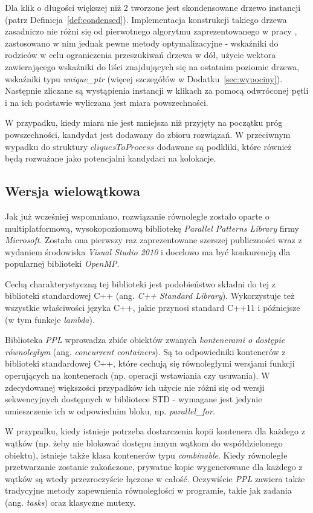 \documentclass[12pt]{article}
\newcounter{algorytm}
\begin{document}
Dla klik o długości większej niż 2 tworzone jest skondensowane drzewo instancji (patrz Definicja~\ref{def:condensed}). Implementacja konstrukcji takiego drzewa zasadniczo nie różni się od pierwotnego algorytmu zaprezentowanego w pracy \cite{chinczyki}, zastosowano w nim jednak pewne metody optymalizacyjne - wskaźniki do rodziców w celu ograniczenia przeszukiwań drzewa w dół, użycie wektora zawierającego wskaźniki do liści znajdujących się na ostatnim poziomie drzewa, wskaźniki typu \textit{unique\_ptr} (więcej szczegółów w Dodatku~\ref{sec:wypociny}). Następnie zliczane są wystąpienia instancji w klikach za pomocą odwróconej pętli i na ich podstawie wyliczana jest miara powszechności.

W przypadku, kiedy miara nie jest mniejsza niż przyjęty na początku próg powszechności, kandydat jest dodawany do zbioru rozwiązań. W przeciwnym wypadku do struktury $ cliquesToProcess $ dodawane są podkliki, które również będą rozważane jako potencjalni kandydaci na kolokacje.

\subsection{Wersja wielowątkowa}

Jak już wcześniej wspomniano, rozwiązanie równoległe zostało oparte o multiplatformową, wysokopoziomową bibliotekę \textit{Parallel Patterns Library} firmy \textit{Microsoft}. Została ona pierwszy raz zaprezentowane szerszej publiczności wraz z wydaniem środowiska \textit{Visual Studio 2010} i docelowo ma być konkurencją dla popularnej biblioteki \textit{OpenMP}. 

Cechą charakterystyczną tej biblioteki jest podobieństwo składni do tej z biblioteki standardowej C++ (ang. \textit{C++ Standard Library}). Wykorzystuje też wszystkie właściwości języka C++, jakie przynosi standard C++11 i późniejsze (w tym funkcje \textit{lambda}).

Biblioteka \textit{PPL} wprowadza zbiór obiektów zwanych \textit{kontenerami o dostępie równoległym} (ang. \textit{concurrent containers}). Są to odpowiedniki kontenerów z biblioteki standardowej C++, które cechują się równoległymi wersjami funkcji operujących na kontenerach (np. operacji wstawiania czy usuwania). W zdecydowanej większości przypadków ich użycie nie różni się od wersji sekwencyjnych dostępnych w bibliotece STD - wymagane jest jedynie umieszczenie ich w odpowiednim bloku, np. \textit{parallel\_for}. 

W przypadku, kiedy istnieje potrzeba dostarczenia kopii kontenera dla każdego z wątków (np. żeby nie blokować dostępu innym wątkom do współdzielonego obiektu), istnieje także klasa kontenerów typu \textit{combinable}. Kiedy równoległe przetwarzanie zostanie zakończone, prywatne kopie wygenerowane dla każdego z wątków są wtedy przezroczyście łączone w całość. Oczywiście \textit{PPL} zawiera także tradycyjne metody zapewnienia równoległości w programie, takie jak zadania (ang. \textit{tasks}) oraz klasyczne mutexy.
\end{document}

